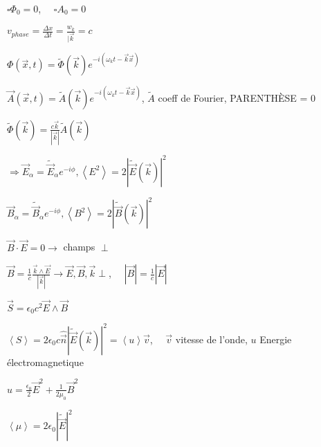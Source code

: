 $\square \Phi_0 = 0$, $\quad \square A_0 = 0$
\squishlist
    \item $v_{phase} = \frac{\Delta x}{\Delta t} = \frac{w_k}{|\vec{k}} = c$
    \item $\Phi(\vec{x},t) = \tilde{\Phi}(\vec{k}) e^{-i(\omega_k t- \vec{k}\vec{x})}$
    \item $\vec{A}(\vec{x},t) = \tilde{A}(\vec{k}) e^{-i(\omega_k t-\vec{k}\vec{x})}$, $\tilde{A}$ coeff de Fourier, PARENTHÈSE = 0 
    \item $\tilde{\Phi}(\vec{k}) = \frac{c\vec{k}}{|\vec{k}|}\tilde{A}(\vec{k})$
    \item $\Rightarrow  \vec{E}_\alpha = \tilde{\vec{E}}_\alpha e^{-i\phi},  \left< E^2\right> = 2|\tilde{\vec{E}}(\vec{k})|^2$
    \item $\vec{B}_\alpha = \tilde{\vec{B}}_\alpha e^{-i\phi},  \left< B^2\right> = 2|\tilde{\vec{B}}(\vec{k})|^2$
    \item $\vec{B}\cdot\vec{E} = 0 \rightarrow$ champs $\perp$
    \item $\vec{B} = \frac{1}{c} \frac{\vec{k} \wedge \vec{E}}{|\vec{k}|} \rightarrow\vec{E},\vec{B},\vec{k} \perp$, $\quad |\vec{B}| = \frac{1}{c}|\vec{E}|$
\squishend

\squishlist
    \item $\vec{S} = \epsilon_0 c^2 \vec{E}\wedge\vec{B}$
    \item $\left< S\right> = 2\epsilon_0 c \hat{\vec{n}} | \tilde{\vec{E}}(\vec{k})|^2 = \left< u\right> \vec{v}$, $\quad \vec{v}$ vitesse de l'onde, $u$ Energie électromagnetique
\squishend
{}

\squishlist
    \item $u=\frac{\epsilon_0}{2} \vec{E}^2 + \frac{1}{2\mu_0} \vec{B}^2$
    \item $\left< \mu \right> = 2\epsilon_0 |\tilde{\vec{E}}|^2$
\squishend